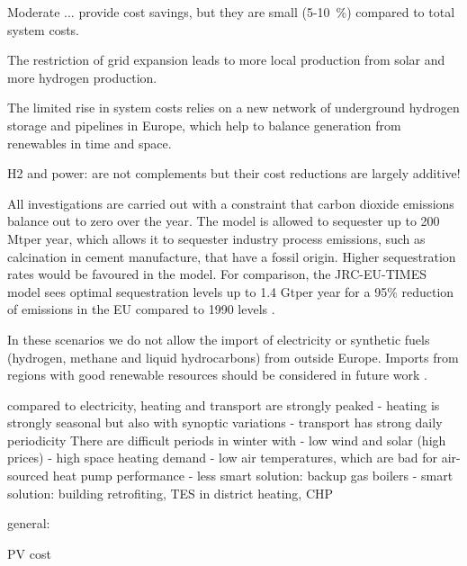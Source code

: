 Moderate ... provide cost
savings, but they are small (5-10~\%) compared to total system
costs.

The restriction of grid
expansion leads to more local production from solar and more hydrogen
production.

The limited rise in system costs relies on a new network
of underground hydrogen storage and pipelines in Europe, which help to balance
generation from renewables in time and space.

H2 and power: are not complements but their cost reductions are largely additive!

All investigations are carried out with a constraint that carbon dioxide
emissions balance out to zero over the year. The model is allowed to sequester
up to 200 Mt\co per year, which allows it to sequester industry process
emissions, such as calcination in cement manufacture, that have a fossil origin.
Higher sequestration rates would be favoured in the model. For comparison, the
JRC-EU-TIMES model sees optimal sequestration levels up to 1.4 Gt\co per year
for a 95\% reduction of \co emissions in the EU compared to 1990 levels
\cite{blancoPotentialHydrogen2018}.

In these scenarios we do not allow the import of electricity or synthetic fuels
(hydrogen, methane and liquid hydrocarbons) from outside Europe. Imports from
regions with good renewable resources should be considered in future work
\cite{fasihiTechnoeconomicAssessment2019,heuserTechnoeconomicAnalysis2019}.


compared to electricity, heating and transport are strongly peaked
- heating is strongly seasonal but also with synoptic variations
- transport has strong daily periodicity
There are difficult periods in winter with
- low wind and solar (high prices)
- high space heating demand
- low air temperatures, which are bad for air-sourced heat pump performance
- less smart solution: backup gas boilers
- smart solution: building retrofiting, TES in district heating, CHP


general:
\cite{
    mckennaScenicnessAssessment2021,
    krummModellingSocial2022,
    weinandImpactPublic2021,
    weinandExploringTrilemma,
    trondleTradeOffsGeographic2020,
    sasseDistributionalTradeoffs2019,
    sasseRegionalImpacts2020,
    ludererImpactDeclining2021,
    EuropeanHydrogen,
    victoria2020,
    victoriaSpeedTechnological2021,
    lombardiPolicyDecision2020,
    tsiropoulosNetzeroEmissions2020,
    europeancommission.directorategeneralforenergy.METISStudy2021,
    deutschNoRegretHydrogen,
    tafarteQuantifyingTrade,
    lehmannManagingSpatial}

PV cost
\cite{
    jaxa-rozenSourcesUncertainty2021,
    victoriaSolarPhotovoltaics2021,
    xiaoPlummetingCosts2021}
